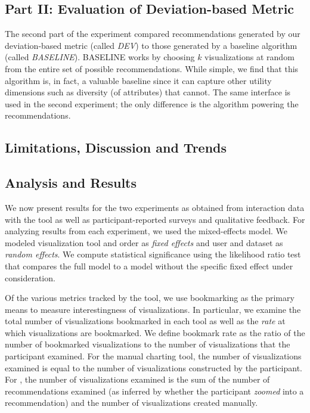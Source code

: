 \subsection{Part II: Evaluation of Deviation-based Metric}

 The second part of the experiment compared recommendations 
 generated by our deviation-based metric (called {\em DEV}) to those generated by a 
 baseline algorithm (called {\em BASELINE}).
 BASELINE works by choosing $k$ visualizations at random from the entire set of 
 possible recommendations.
 While simple, we find that this algorithm is, in fact, a valuable baseline 
 since it can capture other utility dimensions such as diversity (of attributes) 
 that \SeeDB cannot. 
 The same \SeeDB interface is used in the second experiment; 
 the only difference is the algorithm powering the recommendations.

\subsection{Limitations, Discussion and Trends}
 

 

 \subsection{Analysis and Results}
 We now present results for the two experiments as obtained from interaction data
 with the tool as well as participant-reported surveys and qualitative feedback.
 For analyzing results from each experiment, we used the mixed-effects model\cite{}.
 We modeled visualization tool and order as {\em fixed effects} and user and dataset as {\em random effects}.
 We compute statistical significance using the likelihood ratio test that compares
 the full model to a model without the specific fixed effect under consideration.

 Of the various metrics tracked by the tool, we use bookmarking as the primary means to 
 measure interestingness of visualizations.
 In particular, we examine the total number of visualizations bookmarked in each tool
 as well as the {\em rate} at which visualizations are bookmarked.
 We define bookmark rate as the ratio of the number of bookmarked visualizations  
 to the number of visualizations that the participant examined.
 For the manual charting tool, the number of visualizations examined is equal to the number of
 visualizations constructed by the participant.
 For \SeeDB, the number of visualizations examined is the sum of the number of recommendations
 examined (as inferred by whether the participant {\em zoomed} into a recommendation) and the
 number of visualizations created manually.

